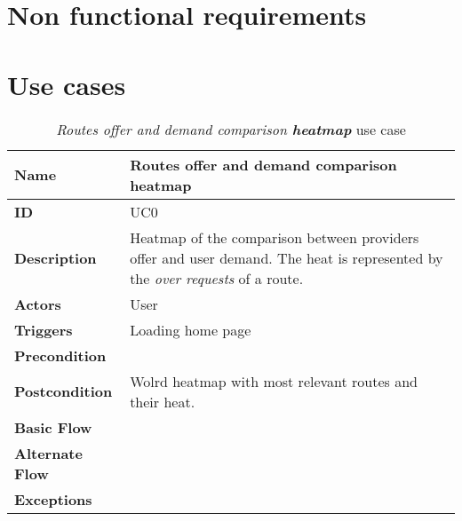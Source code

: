 \section{Non functional requirements}

\section{Use cases}

\begin{table}
\begin{tabular}{|>{\raggedright\arraybackslash}p{3.2cm}|>{\raggedright\arraybackslash}p{10cm}|}
\hline
\textbf{Name}                   & Routes offer and demand comparison \textbf{heatmap} \\
\hline
\textbf{ID}                     & UC0 \\
\hline
\textbf{Description}            & Heatmap of the comparison between providers offer and user demand. The heat is represented by the \textit{over requests} of a route. \\
\hline
\textbf{Actors}                 & User \\
\hline
\textbf{Triggers}               & Loading home page \\
\hline
\textbf{Precondition}           & \\
\hline
\textbf{Postcondition}          & Wolrd heatmap with most relevant routes and their heat. \\
\hline
\textbf{Basic Flow}             & \\
\hline
\textbf{Alternate Flow}         & \\
\hline
\textbf{Exceptions}             & \\
\hline
\end{tabular}
\caption{\textit{Routes offer and demand comparison \textbf{heatmap}} use case}
\label{UC0}
\end{table}

